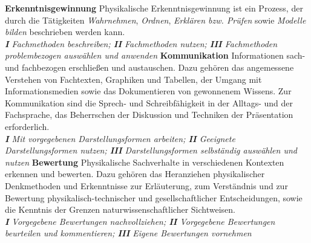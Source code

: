\mip
{\textbf{Erkenntnisgewinnung}} \tabto{12em} \hangindent=2.7cm Physikalische Erkenntnisgewinnung ist ein Prozess, der durch die T\"{a}tigkeiten \emph{Wahrnehmen}, \emph{Ordnen}, \emph{Erkl{\"a}ren bzw. Pr{\"u}fen} sowie \emph{Modelle bilden} beschrieben werden kann. \\ \emph{\textbf{I} Fachmethoden beschreiben; \textbf{II} Fachmethoden nutzen; \textbf{III} Fachmethoden problembezogen ausw{\"a}hlen und anwenden}
\mip
{\textbf{Kommunikation}} \tabto{9em} \hangindent=2.7cm Informationen sach- und fachbezogen erschlie{\ss}en und austauschen. Dazu geh{\"o}ren das angemessene Verstehen von Fachtexten, Graphiken und Tabellen, der Umgang mit Informationsmedien sowie das Dokumentieren von gewonnenem Wissens. Zur Kommunikation sind die Sprech- und Schreibf{\"a}higkeit in der Alltags- und der Fachsprache, das Beherrschen der Diskussion und Techniken der Pr{\"a}sentation erforderlich. \\ \emph{\textbf{I} Mit vorgegebenen Darstellungsformen arbeiten; \textbf{II} Geeignete Darstellungsformen nutzen; \textbf{III} Darstellungsformen selbst{\"a}ndig ausw{\"a}hlen und nutzen}
\mip
{\textbf{Bewertung}} \tabto{7em} \hangindent=2.7cm Physikalische Sachverhalte in verschiedenen Kontexten erkennen und bewerten. Dazu geh{\"o}ren das Heranziehen physikalischer Denkmethoden und Erkenntnisse zur Erl{\"a}uterung, zum Verst{\"a}ndnis und zur Bewertung physikalisch-technischer und gesellschaftlicher Entscheidungen, sowie die Kenntnis der Grenzen naturwissenschaftlicher Sichtweisen. \\ \emph{\textbf{I}  Vorgegebene Bewertungen nachvollziehen; \textbf{II} Vorgegebene Bewertungen beurteilen und kommentieren; \textbf{III} Eigene Bewertungen vornehmen}




